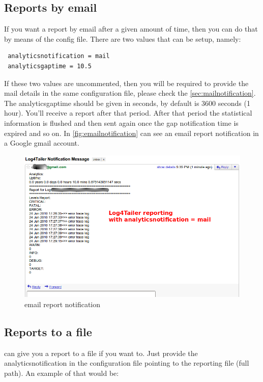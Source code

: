 \subsection{Reports by email}
If you want a report by email after a given amount of time, then you can do
that by means of the config file. There are two values that can be setup,
namely:

\begin{config}
\begin{verbatim}
 analyticsnotification = mail
 analyticsgaptime = 10.5
\end{verbatim}
\end{config}

If these two values are uncommented, then you will be required to provide the
mail details in the same configuration file, please check the
\autoref{sec:mailnotification}. The analyticsgaptime should be given in
seconds, by default is 3600 seconds (1 hour).  You'll receive a report after
that period. After that period the statistical information is flushed and then
sent again once the gap notification time is expired and so on.  In
\autoref{fig:emailnotification} %
can see an email report notification in a Google gmail account.

\begin{figure}[ht]
\includegraphics[scale=0.50]{emailnotification.png}
\caption{\logftailer{} email report notification}\label{fig:emailnotification}
\end{figure}

\subsection{Reports to a file}
\logftailer{} can give you a report to a file if you want to. Just provide the
analyticsnotification in the configuration file pointing to the reporting file
(full path). An example of that would be:

